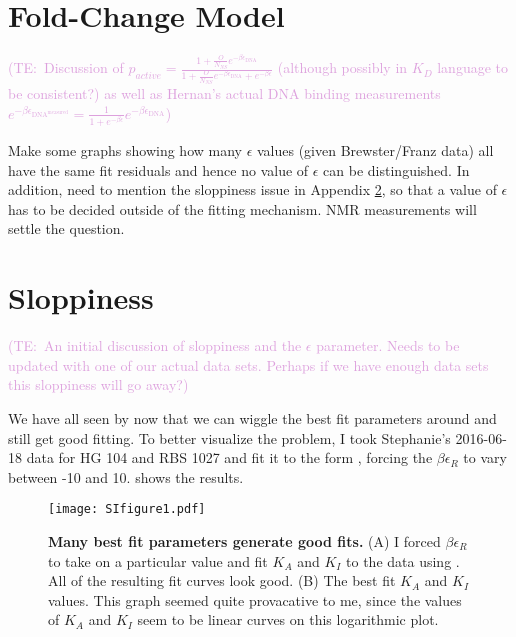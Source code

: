 \documentclass[10pt,letterpaper]{article}
\newcommand{\talComment}[1]{\textcolor{Plum}{(TE:~#1)}}
\newcommand{\letterParen}[1]{(#1)} %
\begin{document}
\appendix

\section{Fold-Change Model} \label{AppendixModel}

\talComment{Discussion of $p_{active} = \frac{1+\frac{O}{N_{NS}}e^{-\beta
			\epsilon_{\text{DNA}}}}{1+\frac{O}{N_{NS}}e^{-\beta \epsilon_{\text{DNA}}} +
		e^{-\beta \epsilon}}$ (although possibly in $K_D$ language to be consistent?) as
	well as Hernan's actual DNA binding measurements $e^{-\beta
		\epsilon_{\text{DNA}^{\text{measured}}}} = \frac{1}{1+e^{-\beta\epsilon}}
	e^{-\beta \epsilon_{\text{DNA}}}$}

Make some graphs showing how many $\epsilon$ values (given Brewster/Franz data)
all have the same fit residuals and hence no value of $\epsilon$ can be
distinguished. In addition, need to mention the sloppiness issue in Appendix \ref{AppendixSloppiness}, so that a value of $\epsilon$ has to be decided outside of the fitting mechanism. NMR measurements will settle the question.

\section{Sloppiness} \label{AppendixSloppiness}

\talComment{An initial discussion of sloppiness and the $\epsilon$ parameter. Needs to be updated with one of our actual data sets. Perhaps if we have enough data sets this sloppiness will go away?}

We have all seen by now that we can wiggle the best fit parameters around and still get good fitting. To better visualize the problem, I took Stephanie's 2016-06-18 data for HG 104 and RBS 1027 and fit it to the form \eref[AppendixSloppinessEq1], forcing the $\beta \epsilon_R$ to vary between -10 and 10. \fref[SIfig1] shows the results.
\begin{figure}[h]
	\centering \texttt{[image: SIfigure1.pdf]}
	\caption{{\bf Many best fit parameters generate good fits.} \letterParen{A} I forced $\beta \epsilon_R$ to take on a particular value and fit $K_A$ and $K_I$ to the data using \eref[AppendixSloppinessEq1]. All of the resulting fit curves look good. \letterParen{B} The best fit $K_A$ and $K_I$ values. This graph seemed quite provacative to me, since the values of $K_A$ and $K_I$ seem to be linear curves on this logarithmic plot.}
	\label{SIfig1}
\end{figure}
\end{document}
